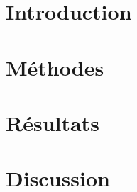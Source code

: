 \documentclass[11pt,letterpaper]{article}
\begin{document}

\twocolumn[]

\section{Introduction}


\section{Méthodes}

\section{Résultats}

\section{Discussion}


\end{document}
